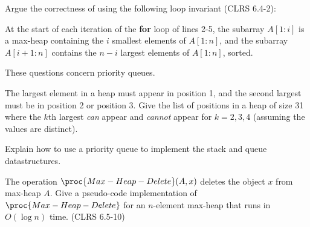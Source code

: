 \documentclass{article}
\begin{document}
\begin{Exercise}[title={Loop invariant for $\proc{Heapsort}$}]
    \noindent
    Argue the correctness of  using the following loop invariant
    (CLRS 6.4-2):

    \begin{displayquote}
        At the start of each iteration of the \textbf{for} loop of lines 2-5,
        the subarray $A[1:i]$ is a max-heap containing the $i$ smallest elements
        of $A[1:n]$, and the subarray $A[i+1:n]$ contains the $n-i$ largest
        elements of $A[1:n]$, sorted.
    \end{displayquote}
\end{Exercise}

\begin{Exercise}[title={Priority Queues}]
    \noindent
    These questions concern priority queues.

    \Question
    The largest element in a heap must appear in position 1, and the second
    largest must be in position 2 or position 3. Give the list of positions in a
    heap of size 31 where the $k$th largest \textit{can} appear and
    \textit{cannot} appear for $k=2,3,4$ (assuming the values are distinct).

    \Question
    Explain how to use a priority queue to implement the stack and queue
    datastructures.

    \Question
    The operation $\proc{Max-Heap-Delete}(A,x)$ deletes the object $x$ from
    max-heap $A$. Give a pseudo-code implementation of $\proc{Max-Heap-Delete}$
    for an $n$-element max-heap that runs in $O(\log n)$ time. (CLRS 6.5-10)

\end{Exercise}
\end{document}
